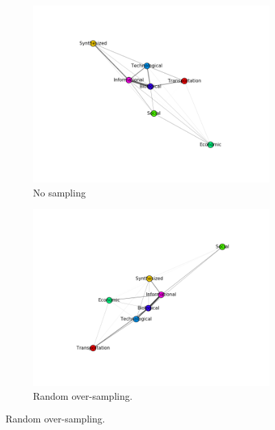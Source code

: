 \documentclass{article}
\begin{document}
\begin{figure}[H]
\begin{subfigure}{0.48\textwidth}
\includegraphics[width=\linewidth]{figs/similarity/Domain/None/graph.png}
\caption{No sampling} \label{no_graph}
\end{subfigure}\hspace*{\fill}
\begin{subfigure}{0.48\textwidth}
\includegraphics[width=\linewidth]{figs/similarity/Domain/RandomOver/graph.png}
\caption{Random over-sampling.} \label{random_over_graph}
\end{subfigure}


\end{figure}
\end{document}
